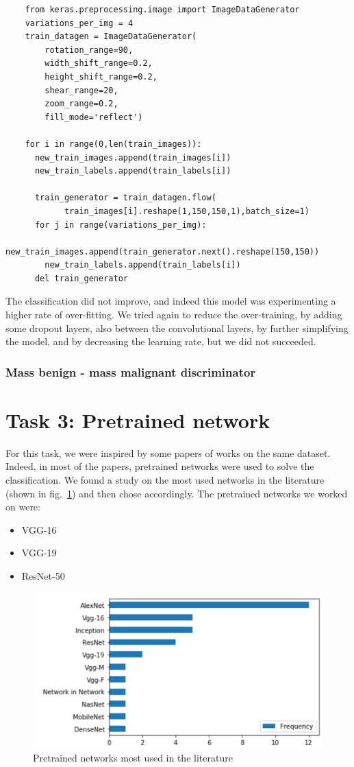\documentclass[11pt,a4paper,oneside]{article}
\begin{document}
\begin{verbatim}
    from keras.preprocessing.image import ImageDataGenerator
    variations_per_img = 4
    train_datagen = ImageDataGenerator(
        rotation_range=90,
        width_shift_range=0.2,
        height_shift_range=0.2,
        shear_range=20,
        zoom_range=0.2,
        fill_mode='reflect')

    for i in range(0,len(train_images)):
      new_train_images.append(train_images[i])
      new_train_labels.append(train_labels[i])
  
      train_generator = train_datagen.flow(
  	    	train_images[i].reshape(1,150,150,1),batch_size=1)
      for j in range(variations_per_img):
        new_train_images.append(train_generator.next().reshape(150,150))
        new_train_labels.append(train_labels[i])
      del train_generator
\end{verbatim}

The classification did not improve, and indeed this model was experimenting a higher rate of over-fitting. We tried again to reduce the over-training, by adding some dropout layers, also between the convolutional layers, by further simplifying the model, and by decreasing the learning rate, but we did not succeeded.

\subsubsection{Mass benign - mass malignant discriminator}

\clearpage

\section{Task 3: Pretrained network}
For this task, we were inspired by some papers of works on the same dataset. Indeed, in most of the papers, pretrained networks were used to solve the classification. 
We found a study on the most used networks in the literature (shown in fig.~\ref{fig:pretrained_networks}) and then chose accordingly. The pretrained networks we worked on were:
\begin{itemize}
\item VGG-16
\item VGG-19
\item ResNet-50
\end{itemize}

\begin{figure}[h]
\centering
\includegraphics[width=.5\textwidth]{images/pretrained_networks}
\caption{Pretrained networks most used in the literature}
\label{fig:pretrained_networks}
\end{figure}
\end{document}
